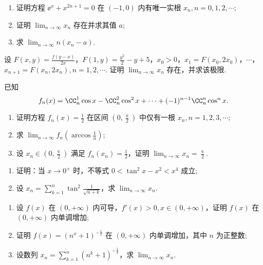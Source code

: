 	\begin{ti}
		\begin{enumerate}
			\item 证明方程 $\ee^{x} + x^{2n+1} = 0$ 在 $(-1,0)$ 内有唯一实根 $x_{n}, n = 0,1,2,\cdots$;
			\item 证明 $\lim_{n \to \infty} x_{n}$ 存在并求其值 $a$;
			\item 求 $\lim_{n \to \infty} n(x_{n} - a)$.
		\end{enumerate}
	\end{ti}

	\begin{ti}
		设 $F(x,y) = \frac{f(y - x)}{2x}$，$F(1,y) = \frac{y^{2}}{2} - y + 5$，$x_{0} > 0$，$x_{1} = F(x_{0},2x_{0})$，$\cdots$，$x_{n+1} = F(x_{n},2x_{n}), n = 1,2,\cdots$. 证明 $\lim_{n \to \infty} x_{n}$ 存在，并求该极限.
	\end{ti}

	\begin{ti}
		已知
		\[
			f_{n}(x) = \CC_{n}^{1} \cos x - \CC_{n}^{2} \cos^{2}x + \cdots + (-1)^{n-1} \CC_{n}^{n} \cos^{n}x.
		\]
		\begin{enumerate}
			\item 证明方程 $f_{n}(x) = \frac{1}{2}$ 在区间 $\left( 0,\frac{\uppi}{2} \right)$ 中仅有一根 $x_{n}, n = 1,2,3,\cdots$;
			\item 求 $\lim_{n \to \infty} f_{n}\left( \arccos\frac{1}{n} \right)$;
			\item 设 $x_{n} \in \left( 0,\frac{\uppi}{2} \right)$ 满足 $f_{n}(x_{n}) = \frac{1}{2}$，证明 $\lim_{n \to \infty} x_{n} = \frac{\uppi}{2}$.
		\end{enumerate}
	\end{ti}

	\begin{ti}
		\begin{enumerate}
			\item 证明：当 $x \to 0^{+}$ 时，不等式 $0 < \tan^{2}x - x^{2} < x^{4}$ 成立;
			\item 设 $x_{n} = \sum_{k=1}^{n} \tan^{2}\frac{1}{\sqrt{n+k}}$，求 $\lim_{n \to \infty}x_{n}$.
		\end{enumerate}
	\end{ti}

	\begin{ti}
		\begin{enumerate}
			\item 设 $f(x)$ 在 $(0,+\infty)$ 内可导，$f'(x) > 0, x \in (0,+\infty)$，证明 $f(x)$ 在 $(0,+\infty)$ 内单调增加;
			\item 证明 $f(x) = \left( n^{x} + 1 \right)^{-\frac{1}{x}}$ 在 $(0,+\infty)$ 内单调增加，其中 $n$ 为正整数;
			\item 设数列 $x_{n} = \sum_{k=1}^{n} \left( n^{k} + 1 \right)^{-\frac{1}{k}}$，求 $\lim_{n \to \infty} x_{n}$.
		\end{enumerate}
	\end{ti}